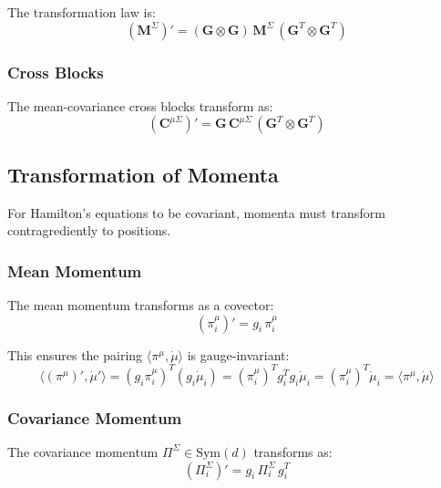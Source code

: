 \documentclass[12pt]{article}
\begin{document}
The transformation law is:
\begin{equation}
\boxed{(\mathbf{M}^\Sigma)' = (\mathbf{G} \otimes \mathbf{G}) \, \mathbf{M}^\Sigma \, (\mathbf{G}^T \otimes \mathbf{G}^T)}
\end{equation}

\subsubsection{Cross Blocks}

The mean-covariance cross blocks transform as:
\begin{equation}
(\mathbf{C}^{\mu\Sigma})' = \mathbf{G} \, \mathbf{C}^{\mu\Sigma} \, (\mathbf{G}^T \otimes \mathbf{G}^T)
\end{equation}

\subsection{Transformation of Momenta}

For Hamilton's equations to be covariant, momenta must transform contragrediently to positions.

\subsubsection{Mean Momentum}

The mean momentum transforms as a covector:
\begin{equation}
\boxed{(\pi_i^\mu)' = g_i \, \pi_i^\mu}
\end{equation}

This ensures the pairing $\langle\pi^\mu, \dot{\mu}\rangle$ is gauge-invariant:
\begin{equation}
\langle(\pi^\mu)', \dot{\mu}'\rangle = (g_i\pi_i^\mu)^T(g_i\dot{\mu}_i) = (\pi_i^\mu)^T g_i^T g_i \dot{\mu}_i = (\pi_i^\mu)^T\dot{\mu}_i = \langle\pi^\mu, \dot{\mu}\rangle
\end{equation}

\subsubsection{Covariance Momentum}

The covariance momentum $\Pi^\Sigma \in \mathrm{Sym}(d)$ transforms as:
\begin{equation}
\boxed{(\Pi_i^\Sigma)' = g_i \, \Pi_i^\Sigma \, g_i^T}
\end{equation}
\end{document}

